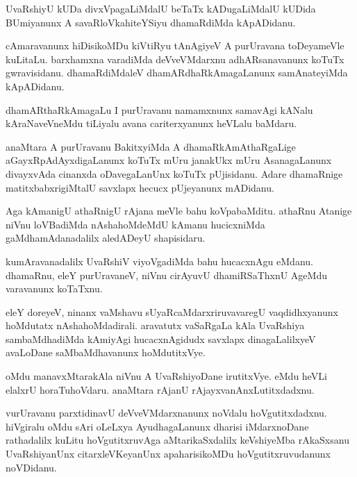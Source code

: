 \documentclass{article}
\begin{document}
\begin{mn}
UvaRshiyU kUDa divxVpagaLiMdalU beTaTx kADugaLiMdalU kUDida BUmiyanunx
A savaRloVkahiteYSiyu dhamaRdiMda kApADidanu.
\end{mn}

\begin{mn}
cAmaravanunx hiDisikoMDu kiVtiRyu tAnAgiyeV A purUravana toDeyameVle
kuLitaLu. barxhamxna varadiMda deVveVMdarxnu adhARsanavanunx koTuTx
gwravisidanu. dhamaRdiMdaleV dhamARdhaRkAmagaLanunx samAnateyiMda kApADidanu.
\end{mn}

\begin{mn}%
dhamARthaRkAmagaLu I purUravanu namamxnunx samavAgi kANalu
kAraNaveVneMdu tiLiyalu avana cariterxyanunx heVLalu baMdaru.
\end{mn}

\begin{mn}
anaMtara A purUravanu BakitxyiMda A dhamaRkAmAthaRgaLige
aGayxRpAdAyxdigaLanunx koTuTx mUru janakUkx mUru AsanagaLanunx
divayxvAda cinanxda oDavegaLanUnx koTuTx pUjisidanu. Adare dhamaRnige
matitxbabxrigiMtalU savxlapx hecucx pUjeyanunx mADidanu.
\end{mn}

\begin{mn}%
Aga kAmanigU athaRnigU rAjana meVle bahu koVpabaMditu. athaRnu Atanige
niVnu loVBadiMda nAshahoMdeMdU kAmanu hucicxniMda gaMdhamAdanadalilx
aledADeyU shapisidaru.
\end{mn}

\begin{mn}
kumAravanadalilx UvaRshiV viyoVgadiMda bahu hucacxnAgu
eMdanu. dhamaRnu, eleY purUravaneV, niVnu cirAyuvU dhamiRSaThxnU
AgeMdu varavanunx koTaTxnu.
\end{mn}

\begin{mn}%
eleY doreyeV, ninanx vaMshavu sUyaRcaMdarxriruvavaregU vaqdidhxyanunx
hoMdutatx nAshahoMdadirali. aravatutx vaSaRgaLa kAla UvaRshiya
sambaMdhadiMda kAmiyAgi hucacxnAgidudx savxlapx dinagaLalilxyeV
avaLoDane saMbaMdhavanunx hoMdutitxVye.
\end{mn}

\begin{mn}
oMdu manavxMtarakAla niVnu A UvaRshiyoDane irutitxVye. eMdu heVLi
elalxrU horaTuhoVdaru. anaMtara rAjanU rAjayxvanAnxLutitxdadxnu.
\end{mn}

\begin{mn}
vurUravanu parxtidinavU deVveVMdarxnanunx noVdalu
hoVgutitxdadxnu. hiVgiralu oMdu sAri oLeLxya AyudhagaLanunx dharisi
iMdarxnoDane rathadalilx kuLitu hoVgutitxruvAga aMtarikaSxdalilx
keVshiyeMba rAkaSxsanu UvaRshiyanUnx citarxleVKeyanUnx apaharisikoMDu
hoVgutitxruvudanunx noVDidanu.
\end{mn}
\end{document}
